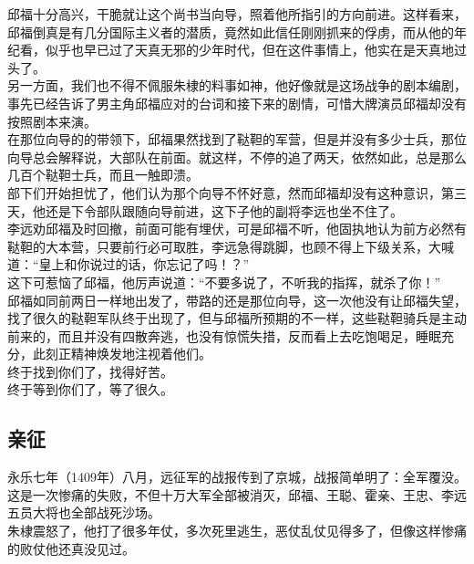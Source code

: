 \begin{multicols}{\theparacolNo}
邱福十分高兴，干脆就让这个尚书当向导，照着他所指引的方向前进。这样看来，邱福倒真是有几分国际主义者的潜质，竟然如此信任刚刚抓来的俘虏，而从他的年纪看，似乎也早已过了天真无邪的少年时代，但在这件事情上，他实在是天真地过头了。\\

另一方面，我们也不得不佩服朱棣的料事如神，他好像就是这场战争的剧本编剧，事先已经告诉了男主角邱福应对的台词和接下来的剧情，可惜大牌演员邱福却没有按照剧本来演。\\

在那位向导的的带领下，邱福果然找到了鞑靼的军营，但是并没有多少士兵，那位向导总会解释说，大部队在前面。就这样，不停的追了两天，依然如此，总是那么几百个鞑靼士兵，而且一触即溃。\\

部下们开始担忧了，他们认为那个向导不怀好意，然而邱福却没有这种意识，第三天，他还是下令部队跟随向导前进，这下子他的副将李远也坐不住了。\\

李远劝邱福及时回撤，前面可能有埋伏，可是邱福不听，他固执地认为前方必然有鞑靼的大本营，只要前行必可取胜，李远急得跳脚，也顾不得上下级关系，大喊道：“皇上和你说过的话，你忘记了吗！？”\\

这下可惹恼了邱福，他厉声说道：“不要多说了，不听我的指挥，就杀了你！”\\

邱福如同前两日一样地出发了，带路的还是那位向导，这一次他没有让邱福失望，找了很久的鞑靼军队终于出现了，但与邱福所预期的不一样，这些鞑靼骑兵是主动前来的，而且并没有四散奔逃，也没有惊慌失措，反而看上去吃饱喝足，睡眠充分，此刻正精神焕发地注视着他们。\\

终于找到你们了，找得好苦。\\

终于等到你们了，等了很久。\\

\subsection{亲征}
永乐七年（1409年）八月，远征军的战报传到了京城，战报简单明了：全军覆没。\\

这是一次惨痛的失败，不但十万大军全部被消灭，邱福、王聪、霍亲、王忠、李远五员大将也全部战死沙场。\\

朱棣震怒了，他打了很多年仗，多次死里逃生，恶仗乱仗见得多了，但像这样惨痛的败仗他还真没见过。\\


\end{multicols}

